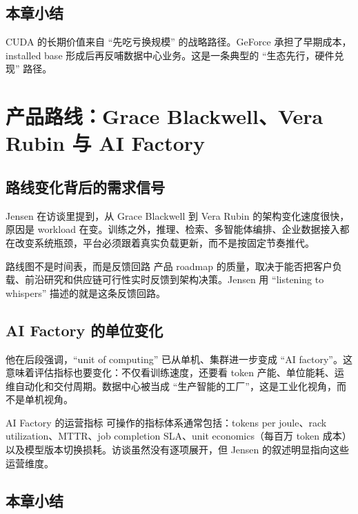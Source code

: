 \documentclass[a4paper]{article}
\begin{document}
\subsection{本章小结}

CUDA 的长期价值来自 ``先吃亏换规模'' 的战略路径。GeForce 承担了早期成本，installed base 形成后再反哺数据中心业务。这是一条典型的 ``生态先行，硬件兑现'' 路径。

\section{产品路线：Grace Blackwell、Vera Rubin 与 AI Factory}

\subsection{路线变化背后的需求信号}

Jensen 在访谈里提到，从 Grace Blackwell 到 Vera Rubin 的架构变化速度很快，原因是 workload 在变。训练之外，推理、检索、多智能体编排、企业数据接入都在改变系统瓶颈，平台必须跟着真实负载更新，而不是按固定节奏推代。

\begin{importantbox}{路线图不是时间表，而是反馈回路}
产品 roadmap 的质量，取决于能否把客户负载、前沿研究和供应链可行性实时反馈到架构决策。Jensen 用 ``listening to whispers'' 描述的就是这条反馈回路。
\end{importantbox}

\subsection{AI Factory 的单位变化}

他在后段强调，``unit of computing'' 已从单机、集群进一步变成 ``AI factory''。这意味着评估指标也要变化：不仅看训练速度，还要看 token 产能、单位能耗、运维自动化和交付周期。数据中心被当成 ``生产智能的工厂''，这是工业化视角，而不是单机视角。

\begin{knowledgebox}{AI Factory 的运营指标}
可操作的指标体系通常包括：tokens per joule、rack utilization、MTTR、job completion SLA、unit economics（每百万 token 成本）以及模型版本切换损耗。访谈虽然没有逐项展开，但 Jensen 的叙述明显指向这些运营维度。
\end{knowledgebox}

\subsection{本章小结}
\end{document}
